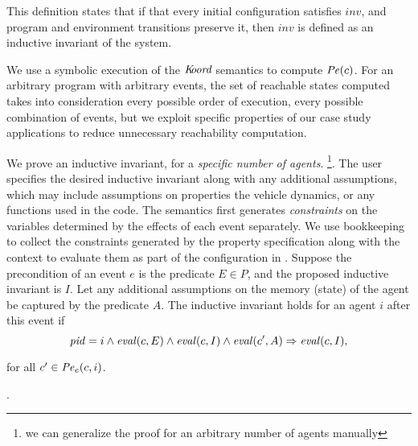 This definition states that if that every initial configuration satisfies $\mathit{inv}$, and  program and environment transitions preserve it, then $\mathit{inv}$ is defined as an inductive invariant of the system.


We use a symbolic execution of the $\emph{K\kern-2pt oord}$ semantics to compute $\mathit{Pe}(c)$. For an arbitrary program with arbitrary events, the set of reachable states computed takes into consideration every possible order of execution, every possible combination of events, but we exploit specific properties of our case study applications to reduce unnecessary reachability computation. 

     We prove an inductive invariant, for a \emph{specific number of agents}. \footnote{we can generalize the proof for an arbitrary number of agents manually}. The user specifies the desired inductive invariant along with any additional assumptions, which may include assumptions on properties the vehicle dynamics, or any functions used in the code. The semantics first generates \emph{constraints} on the variables determined by the effects of each event separately. We use bookkeeping to collect the constraints generated by the property specification along with the context to evaluate them as part of the configuration in \K. Suppose the precondition of an event $e$ is the predicate $E \in P$, and the proposed inductive invariant is $I$. Let any additional assumptions on the memory (state) of the agent be captured by the predicate $A$. The inductive invariant holds for an agent $i$ after this event if
            $$\mathit{pid} = i \wedge \mathit{eval}(c,E)\wedge \mathit{eval}(c,I)\wedge \mathit{eval}(c',A)\Rightarrow \mathit{eval}(c,I),$$

for all $c' \in \mathit{Pe}_e(c,i)$.



 .

